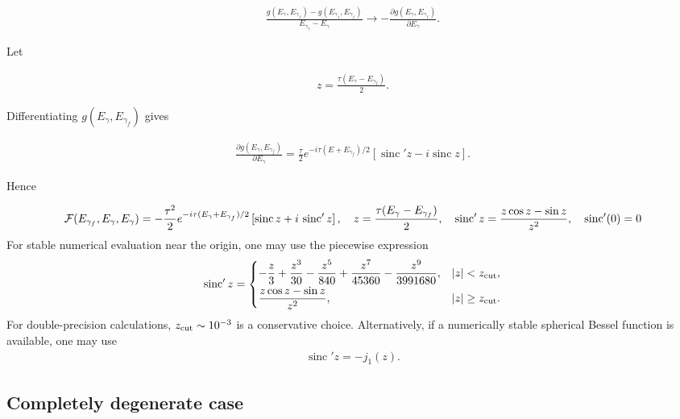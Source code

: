 \begin{align}\frac{g(E_\gamma,E_{\gamma_f})-g(E_{\gamma_1},E_{\gamma_f})}{E_{\gamma_1}-E_\gamma} \longrightarrow -\frac{\partial g(E_\gamma,E_{\gamma_f})}{\partial E_\gamma}.
\end{align}

Let

\begin{align} z=\frac{\tau(E_\gamma-E_{\gamma_f})}{2}.
\end{align}

Differentiating $g(E_\gamma ,E_{\gamma_f})$ gives

\begin{align} \frac{\partial g(E_\gamma,E_{\gamma_f})}{\partial E_\gamma} = \frac{\tau}{2} e^{-i\tau(E+E_{\gamma_f})/2} \left[
    \operatorname{sinc}'z
    -i\operatorname{sinc}z
  \right].
\end{align}

Hence
\begin{importantbox}
  \begin{align}
    {\cal F} (E_{\gamma_f},E_\gamma,E_{\gamma})
    =
    -\frac{\tau^2}{2}
    e^{-i\tau(E_\gamma+E_{\gamma_f})/2}
    \left[
      \operatorname{sinc}z
      +i\,\operatorname{sinc}'z
    \right]
    ,\quad z= \frac{\tau(E_\gamma-E_{\gamma_f})}{2},\quad \operatorname{sinc}'z = \frac{z\cos z-\sin z}{z^2},\quad \operatorname{sinc}'(0)=0
  \end{align}
  For stable numerical evaluation near the origin, one may use the
  piecewise expression
  \begin{align}
    \operatorname{sinc}'z =
    \begin{cases}
      -\dfrac{z}{3}+\dfrac{z^3}{30}-\dfrac{z^5}{840}
      +\dfrac{z^7}{45360}-\dfrac{z^9}{3991680},
      & |z|<z_{\rm cut},\\[1.2ex]
      \dfrac{z\cos z-\sin z}{z^2},
      & |z|\geq z_{\rm cut}.
    \end{cases}
  \end{align}
  For double-precision calculations, $z_{\rm cut}\sim 10^{-3}$ is a
  conservative choice.  Alternatively, if a numerically stable spherical
  Bessel function is available, one may use
  \begin{align}
    \operatorname{sinc}'z=-j_1(z).
  \end{align}
\end{importantbox}

\subsection {Completely degenerate case}

